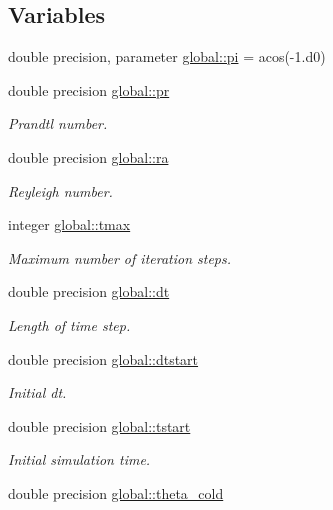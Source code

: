 \subsection*{Variables}
\begin{DoxyCompactItemize}
\item 
double precision, parameter \mbox{\hyperlink{namespaceglobal_a2eeeef6cb4401e0205ced808c718dead}{global\+::pi}} = acos(-\/1.d0)
\item 
double precision \mbox{\hyperlink{namespaceglobal_a31749f11f262d021576cd0d09bdc79c2}{global\+::pr}}
\begin{DoxyCompactList}\small\item\em Prandtl number. \end{DoxyCompactList}\item 
double precision \mbox{\hyperlink{namespaceglobal_a7b363950bb58d4e52dda12a928b2b9e2}{global\+::ra}}
\begin{DoxyCompactList}\small\item\em Reyleigh number. \end{DoxyCompactList}\item 
integer \mbox{\hyperlink{namespaceglobal_ac8816f9dd096716fb9b7e61d57cc5189}{global\+::tmax}}
\begin{DoxyCompactList}\small\item\em Maximum number of iteration steps. \end{DoxyCompactList}\item 
double precision \mbox{\hyperlink{namespaceglobal_a24d27ecfb0e7d422997122c9345bac8b}{global\+::dt}}
\begin{DoxyCompactList}\small\item\em Length of time step. \end{DoxyCompactList}\item 
double precision \mbox{\hyperlink{namespaceglobal_a3c8fbc22da61f7188e79bad2b9ba1d16}{global\+::dtstart}}
\begin{DoxyCompactList}\small\item\em Initial dt. \end{DoxyCompactList}\item 
double precision \mbox{\hyperlink{namespaceglobal_a07363365436fd22a91cdb5a847b4bb88}{global\+::tstart}}
\begin{DoxyCompactList}\small\item\em Initial simulation time. \end{DoxyCompactList}\item 
double precision \mbox{\hyperlink{namespaceglobal_a367640054e0083add94204f1a61bd61a}{global\+::theta\+\_\+cold}}

\end{DoxyCompactItemize}
